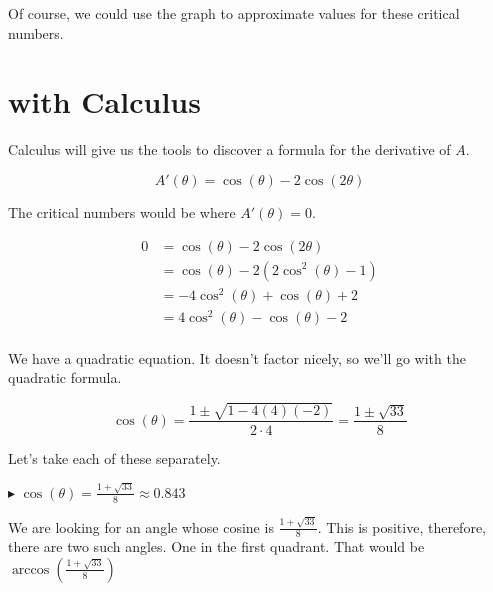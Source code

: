 \documentclass{ximera}
\begin{document}
Of course, we could use the graph to approximate values for these critical numbers.




\section{with Calculus}

Calculus will give us the tools to discover a formula for the derivative of $A$.


\[   A'(\theta) = \cos(\theta)-2 \cos(2\theta)    \]


The critical numbers would be where $A'(\theta) = 0$.



\begin{align*}
0    & = \cos(\theta)-2 \cos(2\theta)   \\
     & = \cos(\theta) - 2 (2 \cos^2(\theta) - 1)    \\
     & = -4 \cos^2(\theta) + \cos(\theta) + 2   \\
     & = 4 \cos^2(\theta) - \cos(\theta) - 2   \\
\end{align*}


We have a quadratic equation.  It doesn't factor nicely, so we'll go with the quadratic formula.



\[   \cos(\theta) = \frac{1 \pm \sqrt{1 - 4 (4)(-2)}}{2 \cdot 4}  = \frac{1 \pm \sqrt{33}}{8}        \]




Let's take each of these separately.



$\blacktriangleright$  $\cos(\theta) = \frac{1 + \sqrt{33}}{8}   \approx  0.843$


We are looking for an angle whose cosine is $\frac{1 + \sqrt{33}}{8}$.  This is positive, therefore, there are two such angles. One in the first quadrant.  That would be $\arccos\left(\frac{1 + \sqrt{33}}{8}\right)$
\end{document}
